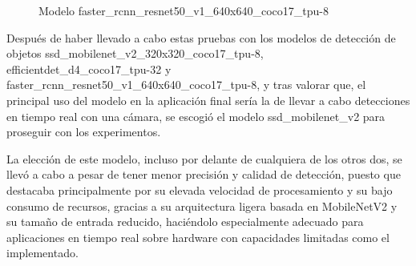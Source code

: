   	\begin{figure}[H]
    		\begin{center}
      		\subcapcentertrue
      		\hspace{2mm}
    	\end{center}
    	\caption{Modelo faster\_rcnn\_resnet50\_v1\_640x640\_coco17\_tpu-8 }
    	\label{fig:modelo_faster_rcnn_resnet50}
  	\end{figure}	
  	
\pagebreak

Después de haber llevado a cabo estas pruebas con los modelos de detección de objetos ssd\_mobilenet\_v2\_320x320\_coco17\_tpu-8, efficientdet\_d4\_coco17\_tpu-32 y faster\_rcnn\_resnet50\_v1\_640x640\_coco17\_tpu-8, y tras valorar que, el principal uso del modelo en la aplicación final sería la de llevar a cabo detecciones en tiempo real con una cámara, se escogió el modelo ssd\_mobilenet\_v2 para proseguir con los experimentos. 

La elección de este modelo, incluso por delante de cualquiera de los otros dos, se llevó a cabo a pesar de tener menor precisión y calidad de detección, puesto que destacaba principalmente por su elevada velocidad de procesamiento y su bajo consumo de recursos, gracias a su arquitectura ligera basada en MobileNetV2 y su tamaño de entrada reducido, haciéndolo especialmente adecuado para aplicaciones en tiempo real sobre hardware con capacidades limitadas como el implementado.\\

